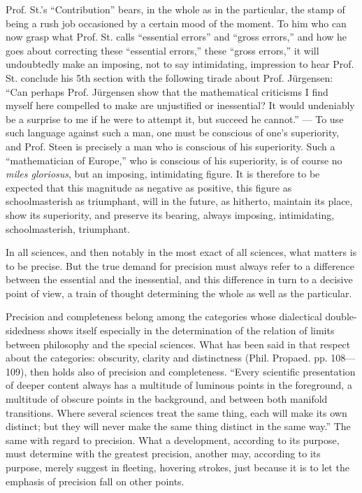 \documentclass[12pt,a4paper,openany]{book}
\newcommand{\opage}[1]{\marginnote{\footnotesize\textit{[#1]}}}
\begin{document}
Prof. St.'s ``Contribution'' bears, in the whole as in the
particular, the stamp of being a rush job occasioned by a certain
\opage{50}\setcounter{footnote}{0}%
mood of the moment. To him who can now
grasp what Prof. St. calls ``essential errors'' and
``gross errors,'' and how he goes about correcting these
``essential errors,'' these ``gross errors,'' it will undoubtedly make
an imposing, not to say intimidating, impression to
hear Prof. St. conclude his 5th section with the following tirade
about Prof. Jürgensen: ``Can perhaps Prof. Jürgensen
\opage{51}\setcounter{footnote}{0}%
show that the mathematical criticisms I find myself here compelled to make are unjustified or inessential? It
would undeniably be a surprise to me if he were to
attempt it, but succeed he cannot.'' --- To use
such language against such a man, one must be
conscious of one's superiority, and Prof. Steen is precisely a
man who is conscious of his superiority. Such a
``mathematician of Europe,'' who is conscious of his superiority, is of course no \textit{miles gloriosus}, but an imposing, intimidating figure. It is therefore to be expected that
this magnitude as negative as positive, this figure as
schoolmasterish as triumphant, will in the future,
as hitherto, maintain its place, show its superiority, and preserve its bearing, always imposing, intimidating, schoolmasterish, triumphant.

In all sciences, and then notably in the most exact
of all sciences, what matters is to be precise. But the
true demand for precision must always refer to a
difference between the essential and the inessential, and this difference in turn to a decisive point of view, a train of thought determining the whole as well as the particular.

Precision and completeness belong among the
categories whose dialectical double-sidedness shows itself especially in the determination of the relation of limits between philosophy and
the special sciences. What has been said in that respect about
the categories: obscurity, clarity and distinctness (Phil.
Propaed. pp. 108---109), then holds also of precision and completeness. ``Every scientific presentation of deeper content always has a multitude of luminous
points in the foreground, a multitude of obscure points in the background, and between both manifold transitions. Where
several sciences treat the same thing, each will make its own
distinct; but they will never make the same thing distinct in the
same way.'' The same with regard to precision.
What a development, according to its purpose, must determine with
\opage{52}\setcounter{footnote}{0}%
the greatest precision, another may, according to its purpose, merely
suggest in fleeting, hovering strokes, just because it is to let
the emphasis of precision fall on other points.
\end{document}
